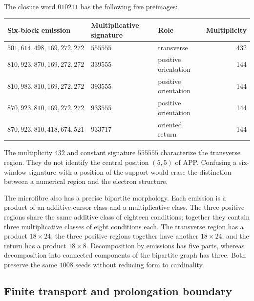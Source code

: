 The closure word \(010211\) has the following five preimages:
\begin{center}\small
\begin{tabular}{@{}lll r@{}}\toprule
Six-block emission&Multiplicative signature&Role&Multiplicity\\\midrule
\(501,614,498,169,272,272\)&\(555555\)&transverse&432\\
\(810,923,870,169,272,272\)&\(339555\)&positive orientation&144\\
\(810,983,810,169,272,272\)&\(393555\)&positive orientation&144\\
\(870,923,810,169,272,272\)&\(933555\)&positive orientation&144\\
\(870,923,810,418,674,521\)&\(933717\)&oriented return&144\\\bottomrule
\end{tabular}
\end{center}
The multiplicity \(432\) and constant signature \(555555\) characterize the transverse region. They do not identify the central position \((5,5)\) of APP. Confusing a six-window signature with a position of the support would erase the distinction between a numerical region and the electron structure.

The microfibre also has a precise bipartite morphology. Each emission is a product of an additive-cursor class and a multiplicative class. The three positive regions share the same additive class of eighteen conditions; together they contain three multiplicative classes of eight conditions each. The transverse region has a product \(18\times24\); the three positive regions together have another \(18\times24\); and the return has a product \(18\times8\). Decomposition by emissions has five parts, whereas decomposition into connected components of the bipartite graph has three. Both preserve the same \(1008\) seeds without reducing form to cardinality.

\subsection{Finite transport and prolongation boundary}


